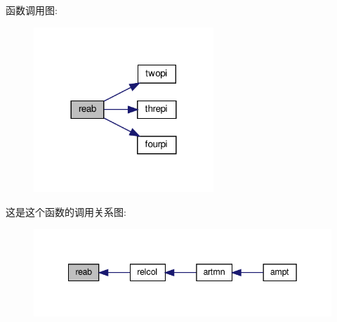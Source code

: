 函数调用图\+:
\nopagebreak
\begin{figure}[H]
\begin{center}
\leavevmode
\includegraphics[width=192pt]{reab_8f90_a6d6781355435a7889727d82e7a8e96dc_cgraph}
\end{center}
\end{figure}
这是这个函数的调用关系图\+:
\nopagebreak
\begin{figure}[H]
\begin{center}
\leavevmode
\includegraphics[width=342pt]{reab_8f90_a6d6781355435a7889727d82e7a8e96dc_icgraph}
\end{center}
\end{figure}
